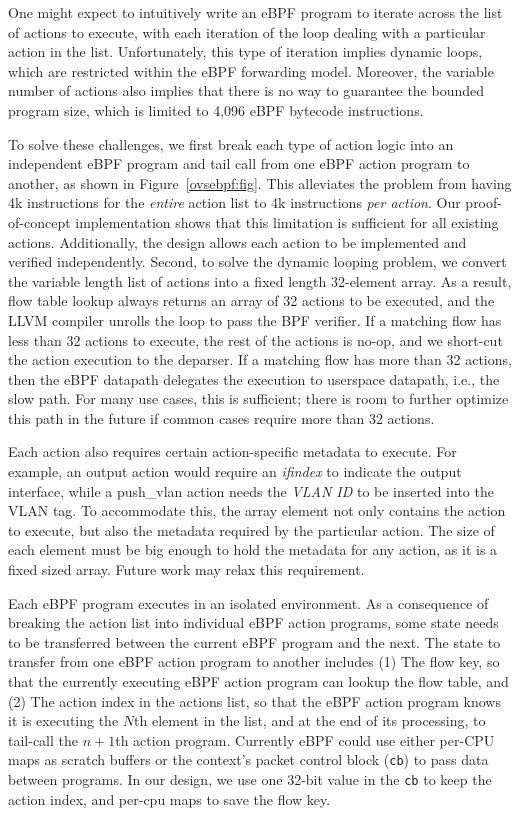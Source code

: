 \documentclass[10pt]{sigplanconf}
\begin{document}
One might expect to intuitively write an eBPF program to iterate across the
list of actions to execute, with each iteration of the loop dealing with a
particular action in the list.  Unfortunately, this type of iteration implies
dynamic loops, which are restricted within the eBPF forwarding model. Moreover,
the variable number of actions also implies that there is no way to guarantee
the bounded program size, which is limited to 4,096 eBPF bytecode instructions.

To solve these challenges, we first break each type of action logic into an
independent eBPF program and tail call from one eBPF action program to
another, as shown in Figure~\ref{ovsebpf:fig}.  This alleviates
the problem from having 4k instructions for the {\em entire} action list to 4k
instructions {\em per action}.  Our proof-of-concept implementation shows that
this limitation is sufficient for all existing actions.  Additionally, the
design allows each action to be implemented and verified independently.
Second, to solve the dynamic looping problem, we convert the variable length
list of actions into a fixed length 32-element array.  As a result,
flow table lookup always returns an array of 32 actions to be executed,
and the LLVM compiler unrolls the loop to pass the BPF verifier.
If a matching flow has less than 32 actions to execute, the rest of the
actions is no-op, and we short-cut the action execution to the deparser.
If a matching flow has more than 32 actions, then the eBPF datapath delegates
the execution to userspace datapath, i.e., the slow path. For many use cases,
this is sufficient; there is room to further optimize this path in the future
if common cases require more than 32 actions.

Each action also requires certain action-specific metadata to execute.
For example, an output action would require an {\em ifindex} to
indicate the output interface, while a push\_vlan action needs the {\em VLAN ID}
to be inserted into the VLAN tag.  To accommodate this, the array element not
only contains the action to execute, but also the metadata required by the
particular action. The size of each element must be big enough to hold the
metadata for any action, as it is a fixed sized array. Future work may
relax this requirement.

Each eBPF program executes in an isolated environment. As a consequence
of breaking the action list into individual eBPF action programs, some state needs to be
transferred between the current eBPF program and the next.
The state to transfer from one eBPF action program to another includes
(1) The flow key, so that the currently executing eBPF action program can
lookup the flow table, and (2) The action index in the actions list, so that
the eBPF action program knows it is executing the $N$th element in the list,
and at the end of its processing, to tail-call the $n+1$th action program.
Currently eBPF could use either per-CPU maps as scratch buffers or the
context's packet control block (\verb+cb+) to pass data between programs. In our
design, we use one 32-bit value in the \verb+cb+ to keep the action
index, and per-cpu maps to save the flow key.
\end{document}
